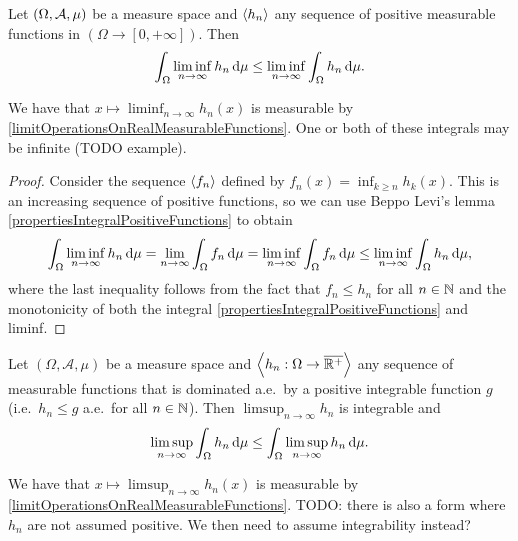 \begin{proposition} \label{FatouLemma}
Let $\sSet{\Omega, \mathcal{A}, \mu}$ be a measure space and $\left\langle h_n \right\rangle$ any sequence of positive measurable functions in $(\Omega\to[0,+\infty])$. Then
\[ \int_\Omega \liminf_{n\to\infty}h_n\operatorname{d \!}{\mu} \leq \liminf_{n\to\infty}\int_\Omega h_n\operatorname{d \!}{\mu}. \]
\end{proposition}
We have that $x\mapsto \liminf_{n\to\infty}h_n(x)$ is measurable by \ref{limitOperationsOnRealMeasurableFunctions}. One or both of these integrals may be infinite (TODO example).
\begin{proof}
Consider the sequence $\left\langle f_n \right\rangle$ defined by $f_n(x) = \inf_{k\geq n}h_k(x)$. This is an increasing sequence of positive functions, so we can use Beppo Levi's lemma \ref{propertiesIntegralPositiveFunctions} to obtain
\[ \int_\Omega\liminf_{n\to\infty}h_n\operatorname{d \!}{\mu} = \lim_{n\to\infty}\int_\Omega f_n\operatorname{d \!}{\mu} = \liminf_{n\to\infty}\int_\Omega f_n\operatorname{d \!}{\mu} \leq \liminf_{n\to\infty}\int_\Omega h_n\operatorname{d \!}{\mu}, \]
where the last inequality follows from the fact that $f_n \leq h_n$ for all $n\in\mathbb{N}$ and the monotonicity of both the integral \ref{propertiesIntegralPositiveFunctions} and liminf.
\end{proof}
\begin{proposition} \label{reverseFatouLemma}
Let $(\Omega, \mathcal{A}, \mu)$ be a measure space and $\left\langle h_n: \Omega \to \overline{\mathbb{R}^+} \right\rangle$ any sequence of measurable functions that is dominated a.e.\  by a positive integrable function $g$ (i.e.\ $h_n\leq g$ a.e.\ for all $n\in\mathbb{N}$). Then $\limsup_{n\to\infty}h_n$ is integrable and
\[ \limsup_{n\to\infty}\int_\Omega h_n\operatorname{d \!}{\mu} \leq \int_\Omega \limsup_{n\to\infty}h_n \operatorname{d \!}{\mu}. \]
\end{proposition}
We have that $x\mapsto \limsup_{n\to\infty}h_n(x)$ is measurable by \ref{limitOperationsOnRealMeasurableFunctions}. TODO: there is also a form where $h_n$ are not assumed positive. We then need to assume integrability instead?
